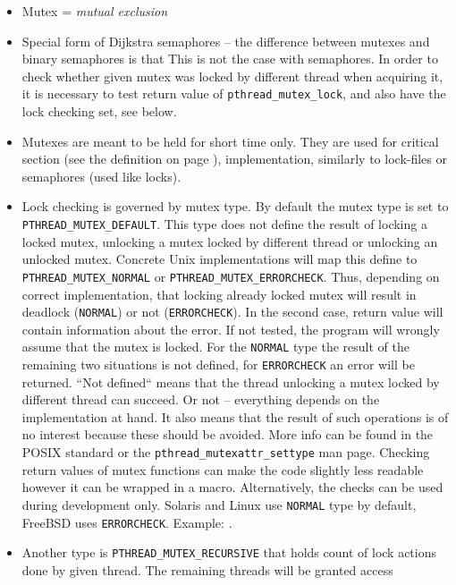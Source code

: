 \begin{itemize}
\item Mutex = \emph{mutual exclusion}
\item Special form of Dijkstra semaphores -- the difference between mutexes and
binary semaphores is that  This is not the case with
semaphores. In order to check whether given mutex was locked by different thread
when acquiring it, it is necessary to test return value of
\texttt{p\-thread\_mutex\_lock}, and also have the lock checking set, see below.
\item Mutexes are meant to be held for short time only. They are used for
critical section (see the definition on page \pageref{CRITICALSECTION}),
implementation, similarly to lock-files or semaphores (used like locks).
\item Lock checking is governed by mutex type. By default the mutex type is set to
\texttt{PTHREAD\_MUTEX\_DEF\-AULT}. This type does not define the result of
locking a locked mutex, unlocking a mutex locked by different thread or
unlocking an unlocked mutex. Concrete Unix implementations will map this define
to \texttt{PTHREAD\_MUTEX\_NORMAL} or \texttt{PTHREAD\_\-MUT\-EX\_ERRORCHECK}.
Thus, depending on correct implementation, that locking already locked mutex
will result in deadlock (\texttt{NORMAL}) or not (\texttt{ERRORCHECK}).
In the second case, return value will contain information about the error.
If not tested, the program will wrongly assume that the mutex is locked.
For the \texttt{NORMAL} type the result of the remaining two situations is not
defined, for \texttt{ERRORCHECK} an error will be returned. ``Not defined``
means that the thread unlocking a mutex locked by different thread can succeed.
Or not -- everything depends on the implementation at hand. It also means that
the result of such operations is of no interest because these should be avoided.
More info can be found in the POSIX standard or the
\texttt{pth\-read\_mutex\-attr\_set\-ty\-pe} man page.
Checking return values of mutex functions can make the code slightly less
readable however it can be wrapped in a macro. Alternatively, the checks can be
used during development only.
Solaris and Linux use \texttt{NORMAL} type by default, FreeBSD uses
\texttt{ERRORCHECK}.
\label{NOTMYLOCK}
Example: .
\item Another type is \texttt{PTHREAD\_MUTEX\_RECURSIVE} that holds count of
lock actions done by given thread. The remaining threads will be granted access

\end{itemize}
